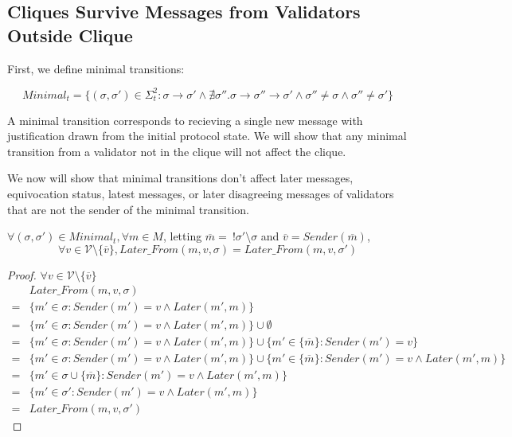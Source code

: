 \subsection{Cliques Survive Messages from Validators Outside Clique}

First, we define minimal transitions:

\begin{defn}
$$
Minimal_t = \{ (\sigma, \sigma') \in \Sigma_t^2: \sigma \to \sigma' \land \nexists \sigma'' . \sigma \to \sigma'' \to \sigma' \land \sigma'' \neq \sigma \land \sigma'' \neq \sigma' \}
$$
\end{defn}

A minimal transition corresponds to recieving a single new message with justification drawn from the initial protocol state. We will show that any minimal transition from a validator not in the clique will not affect the clique.

We now will show that minimal transitions don't affect later messages, equivocation status, latest messages, or later disagreeing messages of validators that are not the sender of the minimal transition.

\begin{lemma}
$\forall (\sigma, \sigma') \in Minimal_t, \forall m \in M$, letting $\overline{m} =~!\sigma'\setminus\sigma$ and $\overline{v} = Sender(\overline{m})$,
$$
\forall v \in \mathcal{V} \setminus \{\overline{v}\}, Later\_From(m,v,\sigma) = Later\_From(m,v,\sigma')
$$
\end{lemma}


\begin{proof}
$\forall v \in \mathcal{V} \setminus \{\overline{v}\}$
\begin{align}
 &Later\_From(m,v,\sigma) \\
=&\{m' \in \sigma : Sender(m') = v \land Later(m', m)\} \\
=&\{m' \in \sigma : Sender(m') = v \land Later(m', m)\} \cup \emptyset \\
=&\{m' \in \sigma : Sender(m') = v \land Later(m', m)\} \cup \{m' \in \{\overline{m}\}: Sender(m') = v\} \\
=&\{m' \in \sigma : Sender(m') = v \land Later(m', m)\} \cup \{m' \in \{\overline{m}\}: Sender(m') = v \land Later(m', m)\} \\
=&\{m' \in \sigma \cup \{\overline{m}\} : Sender(m') = v \land Later(m', m)\} \\
=&\{m' \in \sigma' : Sender(m') = v \land Later(m', m)\} \\
=&Later\_From(m,v,\sigma')
\end{align}
\end{proof}

